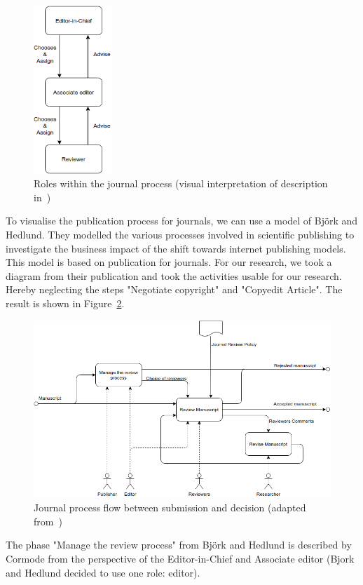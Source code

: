 \documentclass{ou-report}
\newcommand{\outline}[1]{{\color{blue} #1}}
\begin{document}
\begin{figure}[H]
\centering
\includegraphics[width=3cm]{images/c2013.drawio.png}
\caption{Roles within the journal process (visual interpretation of description in~\cite{C2013})}
\label{fig:c2013}
\end{figure}
To visualise the publication process for journals, we can use a model of 
Bj\"ork and Hedlund. They modelled the various processes involved in scientific
publishing to investigate the business impact of the shift towards internet
publishing models. This model is based on publication for journals.
For our research, we took a diagram from their publication and took the 
activities usable for our research. Hereby neglecting the steps 
"Negotiate copyright" and "Copyedit Article". The result is shown in 
Figure~\ref{fig:bh2004_a22331}.


\begin{figure}[H]
\centering
\includegraphics[width=14cm]{images/bh2004_dia_a22331_part.drawio.png}
\caption{Journal process flow between submission and decision (adapted
from~\cite[diagram A22331]{BH2004})}
\label{fig:bh2004_a22331}
\end{figure}
The phase "Manage the review process" from Bj\"ork and Hedlund is described by 
Cormode from the perspective of the Editor-in-Chief and Associate editor (Bjork 
and Hedlund decided to use one role: editor). 
\end{document}
